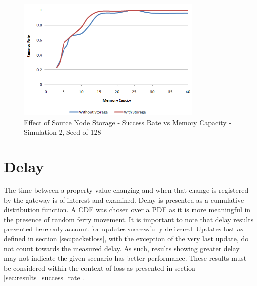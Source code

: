 
\begin{figure}[htbp]
    \centering
    \includegraphics[width=0.8\textwidth]{images/result_sccess_sim2byss_128.png}
    \caption{Effect of Source Node Storage - Success Rate vs Memory Capacity - Simulation 2, Seed of 128}
    \label{fig:result_sccess_sim2byss_128}
\end{figure}


\section{Delay}
\label{sec:results_delay}
The time between a property value changing and when that change is registered by the gateway is of interest and examined.
Delay is presented as a cumulative distribution function.
A CDF was chosen over a PDF as it is more meaningful in the presence of random ferry movement.
%
It is important to note that delay results presented here only account for updates successfully delivered.
Updates lost as defined in section \ref{sec:packetloss}, with the exception of the very last update, do not count towards the measured delay.
As such, results showing greater delay may not indicate the given scenario has better performance.
These results must be considered within the context of loss as presented in section \ref{sec:results_success_rate}.

